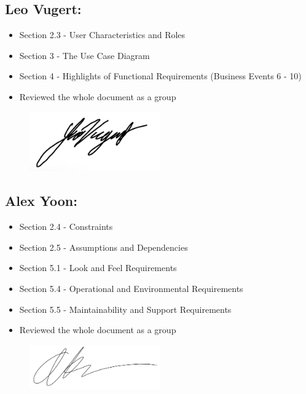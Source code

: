 \documentclass[]{article}
\begin{document}
\subsection*{Leo Vugert:}
\begin{itemize}
	\item Section 2.3 - User Characteristics and Roles
	\item Section 3 - The Use Case Diagram
	\item Section 4 - Highlights of Functional Requirements (Business Events 6 - 10)
	\item Reviewed the whole document as a group
\end{itemize}
\begin{figure}[h]
	\centering
	\includegraphics[width=0.5\textwidth]{LeoSignature.jpg}
	\label{fig:signature}
\end{figure}

\subsection*{Alex Yoon:}
\begin{itemize}
    \item Section 2.4 - Constraints 
    \item Section 2.5 - Assumptions and Dependencies
    \item Section 5.1 - Look and Feel Requirements
    \item Section 5.4 - Operational and Environmental Requirements
    \item Section 5.5 - Maintainability and Support Requirements
    \item Reviewed the whole document as a group
\end{itemize}
\begin{figure}[h]
    \centering
    \includegraphics[width=0.5\textwidth]{AlexSignature.png}
    \label{fig:signature}
\end{figure}
\end{document}
